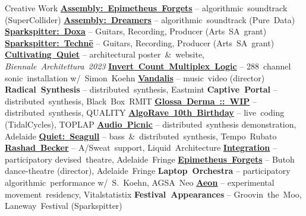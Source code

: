 \begin{rubric}{Creative Work}
      \entry*[2019]
         \href{https://thiswaterfallisyours.bandcamp.com/album/epimetheus-forgets}{\textbf{Assembly:~Epimetheus~Forgets}} -- algorithmic~soundtrack (SuperCollider)
      \entry*[2015]
         \href{https://thiswaterfallisyours.bandcamp.com/album/dreamers}{\textbf{Assembly:~Dreamers}} -- algorithmic~soundtrack (Pure~Data)
      \entry*[2015]
         \href{https://sparkspitter.bandcamp.com/album/doxa}{\textbf{Sparkspitter:~Doxa}} -- Guitars, Recording, Producer \mbox{(Arts~SA~grant)}
      \entry*[2014]
         \href{https://sparkspitter.bandcamp.com/album/techn}{\textbf{Sparkspitter:~Technē}} -- Guitars, Recording, Producer \mbox{(Arts~SA~grant)}
      \entry*[2023]
         \href{https://unsettlingqueenstown.org/openarchive/cultivating-quiet/}{\textbf{Cultivating~Quiet}} -- architectural poster~\&~website, \mbox{\textit{Biennale~Architettura~2023}}
      \entry*[2017]
         \href{https://youtu.be/596zUpXyG9g}{\textbf{Invert~Count~Multiplex~Logic}} -- 288~channel sonic~installation w/~Simon~Koehn
      \entry*[2014]
         \href{https://vimeo.com/96894214}{\textbf{Vandalis}} -- music~video (director)
      \entry*[2026]
        \textbf{Radical~Synthesis} -- distributed~synthesis, Eastmint
      \entry*[2026]
        \textbf{Captive~Portal} -- distributed~synthesis, Black~Box~RMIT
      \entry*[2025]
        \href{https://youtu.be/_a4BFPdEpOA}{\textbf{Glossa~Derma~::~WIP}} -- distributed~synthesis, QUALITY
      \entry*[2022]
         \href{https://youtu.be/fZZstGQxjpU}{\textbf{AlgoRave~10th~Birthday}} -- live~coding (TidalCycles), TOPLAP
      \entry*[2022]
         \href{https://youtu.be/gg9udLivhFA}{\textbf{Audio~Picnic}} -- distributed~synthesis demonstration, Adelaide
      \entry*[2021]
         \href{https://www.temporubato.com.au/tempo-concerts/qsg}{\textbf{Quiet:~Seagull}} -- bass~\&~distributed~synthesis, Tempo~Rubato
      \entry*[2018]
         \href{https://liquidarchitecture.org.au/events/rashad-becker-adelaide}{\textbf{Rashad~Becker}} -- A/Sweat~support, Liquid~Architecture
      \entry*[2017]
         \href{http://www.fineprintmagazine.com/integration}{\textbf{Integration}} -- participatory devised~theatre, \mbox{Adelaide~Fringe}
      \entry*[2016]
         \href{https://youtu.be/86Ra-5fDEsE}{\textbf{Epimetheus~Forgets}} -- Butoh dance-theatre (director), \mbox{Adelaide~Fringe}
      \entry*[2016]
         \textbf{Laptop~Orchestra} -- participatory algorithmic~performance w/~S.~Koehn, \mbox{AGSA~Neo}
      \entry*[2016]
         \href{https://vitalstatistix.com.au/residencies/aeon-2/}{\textbf{Aeon}} -- experimental movement~residency, Vitalstatistix
      \entry*[2015]
         \textbf{Festival~Appearances} -- Groovin~the~Moo, Laneway~Festival \mbox{(Sparkspitter)}
\end{rubric}

